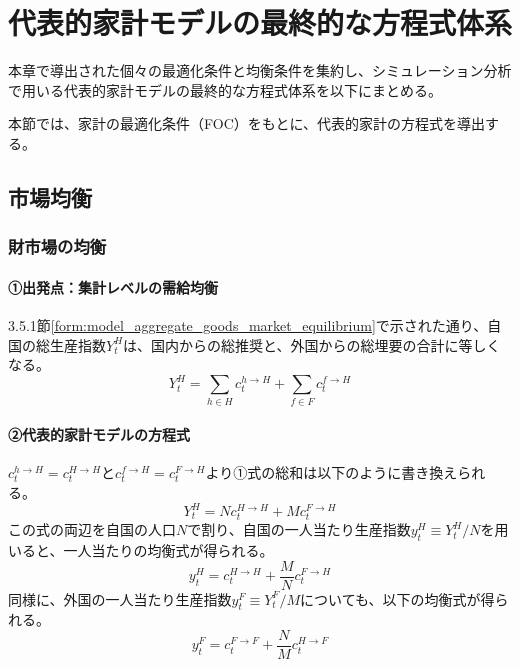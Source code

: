 
\section{代表的家計モデルの最終的な方程式体系}
\label{sec:model_final_equations}
本章で導出された個々の最適化条件と均衡条件を集約し、シミュレーション分析で用いる代表的家計モデルの最終的な方程式体系を以下にまとめる。

本節では、家計の最適化条件（FOC）をもとに、代表的家計の方程式を導出する。

\subsection{市場均衡}
\label{sec:model_final_equations_market}
\subsubsection{財市場の均衡}
\label{sec:model_final_equations_market_goods}
\paragraph{①出発点：集計レベルの需給均衡}\label{sec:model_final_equations_market_goods_agg_origin}
3.5.1節\eqref{form:model_aggregate_goods_market_equilibrium}で示された通り、自国の総生産指数\(Y_t^H\)は、国内からの総推奨と、外国からの総埋要の合計に等しくなる。
\begin{equation}
Y_t^H=\sum_{h\in H}c_t^{h\to H}+\sum_{f\in F}c_t^{f\to H}
\label{form:model_final_equations_market_goods_agg_restated}
\end{equation}

\paragraph{②代表的家計モデルの方程式}\label{sec:model_final_equations_market_goods_ra_eq}
\(c_t^{h\to H}=c_t^{H\to H}\)と\(c_t^{f\to H}=c_t^{F\to H}\)より①式の総和は以下のように書き換えられる。
\begin{equation}
Y_t^H=Nc_t^{H\to H}+Mc_t^{F\to H}
\label{form:model_final_equations_market_goods_agg_sum}
\end{equation}
この式の両辺を自国の人口\(N\)で割り、自国の一人当たり生産指数\(y_t^H\equiv Y_t^H/N\)を用いると、一人当たりの均衡式が得られる。
\begin{equation}
y_t^H=c_t^{H\to H}+\frac{M}{N}c_t^{F\to H}
\label{form:model_final_equations_market_goods_eq_h}
\end{equation}
同様に、外国の一人当たり生産指数\(y_t^F\equiv Y_t^F/M\)についても、以下の均衡式が得られる。
\begin{equation}
y_t^F=c_t^{F\to F}+\frac{N}{M}c_t^{H\to F}
\label{form:model_final_equations_market_goods_eq_f}
\end{equation}

